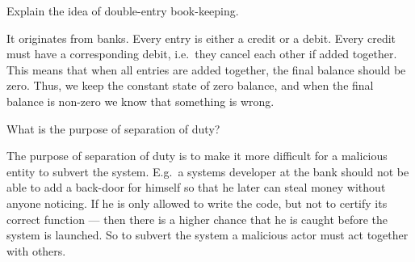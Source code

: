 \question[3]\label{q:accountability}
Explain the idea of double-entry book-keeping.

\begin{solution}
  It originates from banks.
  Every entry is either a credit or a debit.
  Every credit must have a corresponding debit, i.e.\ they cancel each other if 
  added together.
  This means that when all entries are added together, the final balance should 
  be zero.
  Thus, we keep the constant state of zero balance, and when the final balance 
  is non-zero we know that something is wrong.
\end{solution}


\question\label{q:accountability}


\question\label{q:accountability}
What is the purpose of separation of duty?

\begin{solution}
  The purpose of separation of duty is to make it more difficult for 
  a malicious entity to subvert the system.
  E.g.\ a systems developer at the bank should not be able to add a back-door 
  for himself so that he later can steal money without anyone noticing.
  If he is only allowed to write the code, but not to certify its correct 
  function --- then there is a higher chance that he is caught before the 
  system is launched.
  So to subvert the system a malicious actor must act together with others.
\end{solution}


